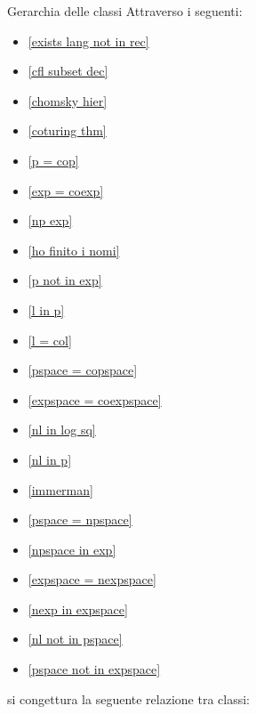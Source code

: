 \documentclass[a4paper, 12pt]{report}
\begin{document}
    \begin{framedobs}[breakable]{Gerarchia delle classi}
        Attraverso i seguenti:

        \begin{itemize}
            \item \cref{exists lang not in rec}
            \item \cref{cfl subset dec}
            \item \cref{chomsky hier}
            \item \cref{coturing thm}
            \item \cref{p = cop}
            \item \cref{exp = coexp}
            \item \cref{np exp}
            \item \cref{ho finito i nomi}
            \item \cref{p not in exp}
            \item \cref{l in p}
            \item \cref{l = col}
            \item \cref{pspace = copspace}
            \item \cref{expspace = coexpspace}
            \item \cref{nl in log sq}
            \item \cref{nl in p}
            \item \cref{immerman}
            \item \cref{pspace = npspace}
            \item \cref{npspace in exp}
            \item \cref{expspace = nexpspace}
            \item \cref{nexp in expspace}
            \item \cref{nl not in pspace}
            \item \cref{pspace not in expspace}
        \end{itemize}

        si congettura la seguente relazione tra classi:


\end{framedobs}
\end{document}
